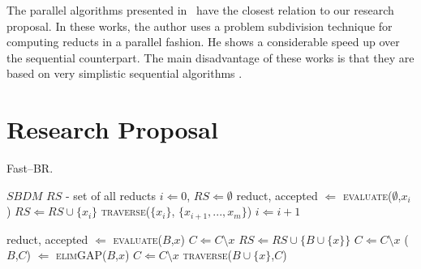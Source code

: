\documentclass[citenumber]{elsarticle}
\renewcommand{\algorithmicrequire}{\textbf{Input:}}
\renewcommand{\algorithmicensure}{\textbf{Output:}}
\begin{document}
	The parallel algorithms presented in~\cite{Susmaga1998,Susmaga2004} have the closest relation to our research proposal. In these works, the author uses a problem subdivision technique for computing reducts in a parallel fashion. He shows a considerable speed up over the sequential counterpart. The main disadvantage of these works is that they are based on very simplistic sequential algorithms \cite{Skowron92,susmaga1998effective}. 
%
\section{Research Proposal}\label{Proposal} 
%    
	\renewcommand{\algorithmicrequire}{\textbf{Input:}}
	\renewcommand{\algorithmicensure}{\textbf{Output:}}
	\begin{algorithm}
		\footnotesize
		\caption{Fast--BR.}
		\label{alg:RSDM}
		\begin{multicols}{2}
		\begin{algorithmic}[1]
			\Require $SBDM$
			\Ensure $RS$ - set of all reducts
			\State $i \Leftarrow 0$, $RS \Leftarrow \emptyset$
				\State reduct, accepted $\Leftarrow$ \textsc{evaluate}($\emptyset$,$x_i$)
					\State $RS \Leftarrow RS\cup\lbrace x_i \rbrace$
				\Else
					\State \textsc{traverse}($\lbrace x_i \rbrace$, $\lbrace x_{i+1},..., x_m\rbrace$)
				\EndIf
				\State $i \Leftarrow i+1$
			\EndWhile
			
				\State reduct, accepted $\Leftarrow$ \textsc{evaluate}($B$,$x$)
					\State $C \Leftarrow C\setminus x$
					\State $RS \Leftarrow RS\cup\lbrace B\cup \lbrace x\rbrace \rbrace$
				\Else
						\State $C \Leftarrow C\setminus x$
					\EndIf
				\EndIf
			\EndFor
				\State ($B$,$C$) $\Leftarrow$ \textsc{elimGAP}($B$,$x$)
			\EndIf
				\State $C \Leftarrow C\setminus x$
				\State \textsc{traverse}($B\cup \lbrace x\rbrace$,$C$)
			\EndFor
			\EndProcedure
		\end{algorithmic}
		\end{multicols}
	\end{algorithm}    
	
\end{document}
